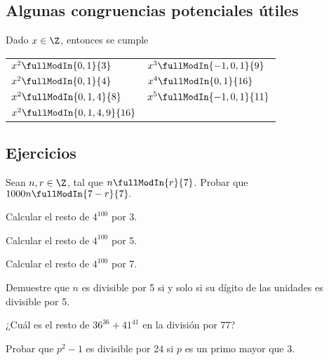 \subsection{Algunas congruencias potenciales útiles}
Dado $x \in \Z$, entonces se cumple
\begin{table}[H]
    \centering
    \begin{tabular}{p{5cm} p{5cm}}
        $x^2 \fullModIn{0, 1}{3}$ & $x^3 \fullModIn{-1, 0, 1}{9}$
        \\
        $x^2 \fullModIn{0, 1}{4}$ & $x^4 \fullModIn{0, 1}{16}$
        \\
        $x^2 \fullModIn{0, 1, 4}{8}$ & $x^5 \fullModIn{-1, 0, 1}{11}$
        \\
        $x^2 \fullModIn{0, 1, 4, 9}{16}$
    \end{tabular}
\end{table}

\subsection{Ejercicios}

\begin{exercise}
    Sean $n, r \in \Z$, tal que $n \fullModIn{r}{7}$.
    Probar que $1000n \fullModIn{7 - r}{7}.$
\end{exercise}

\begin{exercise}
    Calcular el resto de $4^{100}$ por 3.
\end{exercise}

\begin{exercise}
    Calcular el resto de $4^{100}$ por 5.
\end{exercise}

\begin{exercise}
    Calcular el resto de $4^{100}$ por 7.
\end{exercise}

\begin{exercise}
    Demuestre que $n$ es divisible por 5 si y solo si su dígito de las unidades es divisible por 5.
\end{exercise}

\begin{exercise}
    ¿Cuál es el resto de $36^{36} + 41^{41}$ en la división por 77?
\end{exercise}

\begin{exercise}
    Probar que $p^2 - 1$ es divisible por $24$ si $p$ es un primo mayor que $3$.
\end{exercise}

